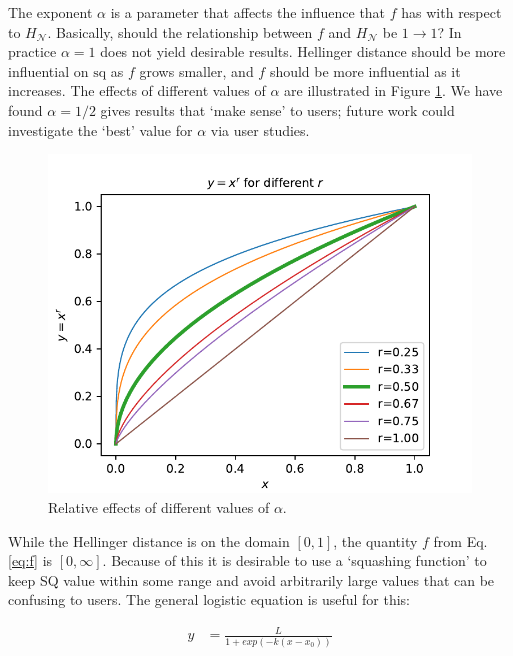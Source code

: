 The exponent $\alpha$ is a parameter that affects the influence that $f$ has with respect to $H_{\mathcal{N}}$. Basically, should the relationship between $f$ and $H_{\mathcal{N}}$ be $1\to1$? In practice $\alpha=1$ does not yield desirable results. Hellinger distance should be more influential on $\text{sq}$ as $f$ grows smaller, and $f$ should be more influential as it increases. The effects of different values of $\alpha$ are illustrated in Figure \ref{fig:alphas}. We have found $\alpha=1/2$ gives results that `make sense' to users; future work could investigate the `best' value for $\alpha$ via user studies.

\begin{figure}[tbp]
    \centering
    \includegraphics[width=0.9\linewidth]{Figures/power_comparison}
    \caption{Relative effects of different values of $\alpha$.}
    \label{fig:alphas}
\end{figure}

While the Hellinger distance is on the domain $[0,1]$, the quantity $f$ from Eq. \ref{eq:f} is $[0,\infty]$. Because of this it is desirable to use a `squashing function' to keep SQ value within some range and avoid arbitrarily large values that can be confusing to users. The general logistic equation is useful for this:

\begin{align}
    y &= \frac{L}{1+exp(-k(x-x_0))} \label{eq:get_log}
\end{align}

